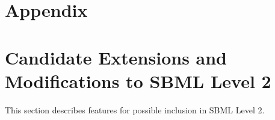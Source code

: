 \documentclass[10pt]{cekarticle}
\begin{document}

\newpage
\section{Appendix}
\setcounter{secnumdepth}{2}
\appendix
\section{Candidate Extensions and Modifications to SBML Level 2}
\label{apdx:extensions}
This section describes features for possible inclusion in SBML Level 2.

\end{document}
